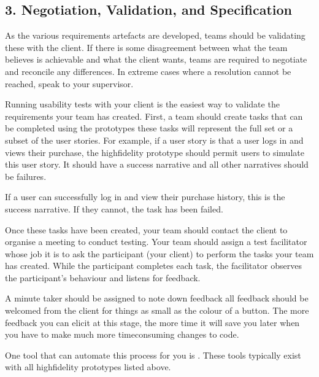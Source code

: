 \documentclass[letterpaper,10pt,english]{jupyterBook}
\begin{document}
\subsection{3. Negotiation, Validation, and Specification}
\label{\detokenize{chapter_8/requirements_elicitation:negotiation-validation-and-specification}}
\sphinxAtStartPar
As the various requirements artefacts are developed, teams should be
validating these with the client. If there is some disagreement between
what the team believes is achievable and what the client wants, teams
are required to negotiate and reconcile any differences. In extreme
cases where a resolution cannot be reached, speak to your supervisor.

\sphinxAtStartPar
Running usability tests with your client is the easiest way to validate
the requirements your team has created. First, a team should create
tasks that can be completed using the prototypes \sphinxhyphen{} these tasks will
represent the full set or a subset of the user stories. For example, if
a user story is that a user logs in and views their purchase, the
high\sphinxhyphen{}fidelity prototype should permit users to simulate this user story.
It should have a success narrative and all other narratives should be
failures.

\sphinxAtStartPar
If a user can successfully log in and view their purchase history, this
is the success narrative. If they cannot, the task has been failed.

\sphinxAtStartPar
Once these tasks have been created, your team should contact the client
to organise a meeting to conduct testing. Your team should assign a test
facilitator whose job it is to ask the participant (your client) to
perform the tasks your team has created. While the participant completes
each task, the facilitator observes the participant’s behaviour and
listens for feedback.

\sphinxAtStartPar
A minute taker should be assigned to note down feedback \sphinxhyphen{} all feedback
should be welcomed from the client for things as small as the colour of
a button. The more feedback you can elicit at this stage, the more time
it will save you later when you have to make much more time\sphinxhyphen{}consuming
changes to code.

\sphinxAtStartPar
One tool that can automate this process for you is
.
These tools typically exist with all high\sphinxhyphen{}fidelity prototypes listed
above.
\end{document}
